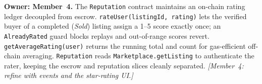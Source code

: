 \textbf{Owner: Member~4.} The \texttt{Reputation} contract maintains an on-chain rating ledger decoupled from escrow. \texttt{rateUser(listingId, rating)} lets the verified buyer of a completed (\emph{Sold}) listing assign a 1--5 score exactly once; an \texttt{AlreadyRated} guard blocks replays and out-of-range scores revert. \texttt{getAverageRating(user)} returns the running total and count for gas-efficient off-chain averaging. \texttt{Reputation} reads \texttt{Marketplace.getListing} to authenticate the rater, keeping the escrow and reputation slices cleanly separated. \emph{[Member~4: refine with events and the star-rating UI.]}
